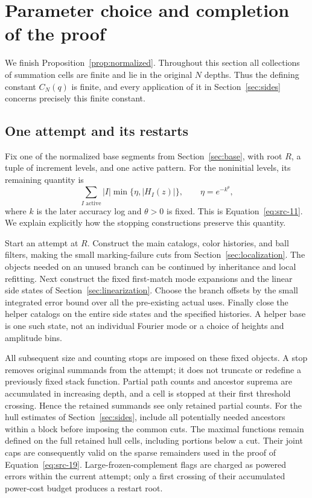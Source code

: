 \section{Parameter choice and completion of the proof}\label{sec:completion}
We finish Proposition~\ref{prop:normalized}.  Throughout this section all
collections of summation cells are finite and lie in the original $N$
depths.  Thus the defining constant $C_N(q)$ is finite, and every
application of it in Section~\ref{sec:sides} concerns precisely this
finite constant.

\subsection{One attempt and its restarts}
Fix one of the normalized base segments from Section~\ref{sec:base},
with root $R$, a tuple of increment levels, and one active pattern.
For the noninitial levels, its remaining quantity is
\[
 \sum_{I\text{ active}}|I|\min\{\eta,|H_I(z)|\},
 \qquad \eta=e^{-k^\theta},
\]
where $k$ is the later accuracy log and $\theta>0$ is fixed.
This is Equation~\eqref{eq:src-11}.
We explain explicitly how the stopping constructions preserve this
quantity.

Start an attempt at $R$.  Construct the main catalogs, color histories,
and ball filters, making the small marking-failure cuts from
Section~\ref{sec:localization}.  The objects needed on an unused branch
can be continued by inheritance and local refitting.  Next construct the
fixed first-match mode expansions and the linear side states of
Section~\ref{sec:linearization}.  Choose the branch offsets by the small
integrated error bound over all the pre-existing actual uses.  Finally
close the helper catalogs on the entire side states and the specified
histories.  A helper base is one such state, not an individual Fourier
mode or a choice of heights and amplitude bins.

All subsequent size and counting stops are imposed on these fixed
objects.  A stop removes original summands from the attempt; it does not
truncate or redefine a previously fixed stack function.  Partial path
counts and ancestor suprema are accumulated in increasing depth, and a
cell is stopped at their first threshold crossing.  Hence the retained
summands see only retained partial counts.  For the hull estimates of
Section~\ref{sec:sides}, include all potentially needed ancestors within
a block before imposing the common cuts.  The maximal functions remain
defined on the full retained hull cells, including portions below a cut.
Their joint caps are consequently valid on the sparse remainders used
in the proof of Equation~\eqref{eq:src-19}.
Large-frozen-complement flags are charged as powered errors within the
current attempt; only a first crossing of their accumulated power-cost
budget produces a restart root.

